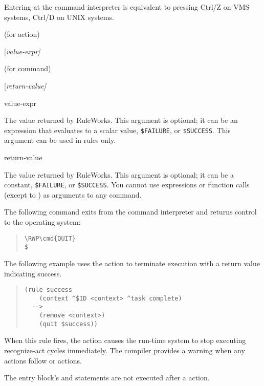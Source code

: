 {{Entering  at the command interpreter is equivalent to
pressing Ctrl/Z on VMS systems, Ctrl/D on UNIX systems.

\Format (for action)

 [\it{value-expr}]

\Format (for command)

 [\it{return-value}]

\begin{arguments}
\item[value-expr]

  The value returned by RuleWorks. This argument is optional; it can
  be an expression that evaluates to a scalar value,
  \verb|$FAILURE|, or \verb|$SUCCESS|. This argument can be used in
  rules only.

\item[return-value]

  The value returned by RuleWorks. This argument is optional; it can
  be a constant, \verb|$FAILURE|, or \verb|$SUCCESS|. You cannot use
  expressions or function calls (except to ) as arguments
  to any command.
\end{arguments}

\Example

The following command exits from the command interpreter and
returns control to the operating system:

\begin{quote}
\begin{Verbatim}[commandchars=\\\{\}]
\RWP\cmd{QUIT}
$
\end{Verbatim}
\end{quote}

The following example uses the  action to terminate
execution with a return value indicating success.
\begin{quote}
\begin{verbatim}
(rule success
    (context ^$ID <context> ^task complete)
  -->
    (remove <context>)
    (quit $success))
\end{verbatim}
\end{quote}

When this rule fires, the  action causes the run-time system
to stop executing recognize-act cycles immediately.  The compiler
provides a warning when any actions follow  or 
actions.

The entry block's  and  statements are not
executed after a  action.

}}
